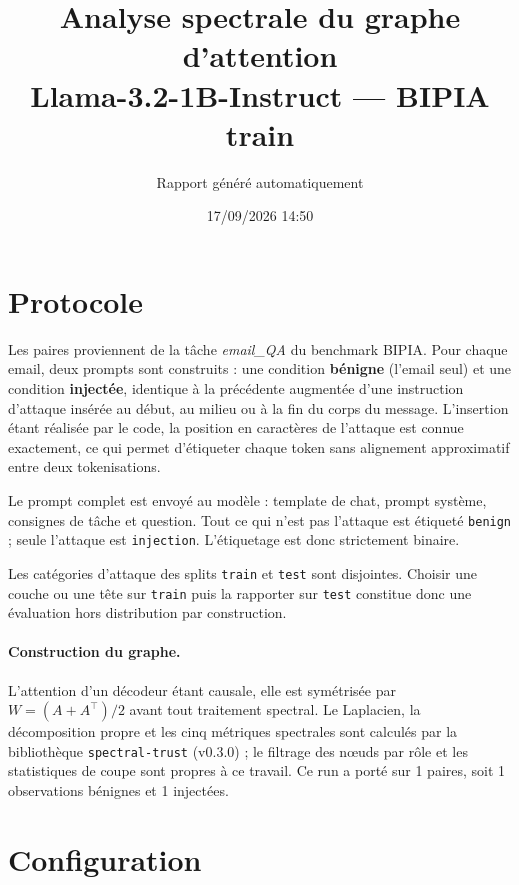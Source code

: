 \documentclass[11pt,a4paper]{article}
\title{Analyse spectrale du graphe d'attention\\Llama-3.2-1B-Instruct --- BIPIA train}
\author{Rapport généré automatiquement}
\date{17/09/2026 14:50}
\begin{document}
\maketitle

\section{Protocole}


Les paires proviennent de la tâche \emph{email\_QA} du benchmark BIPIA.
Pour chaque email, deux prompts sont construits : une condition \textbf{bénigne}
(l'email seul) et une condition \textbf{injectée}, identique à la précédente
augmentée d'une instruction d'attaque insérée au début, au milieu ou à la fin
du corps du message. L'insertion étant réalisée par le code, la position en
caractères de l'attaque est connue exactement, ce qui permet d'étiqueter chaque
token sans alignement approximatif entre deux tokenisations.

Le prompt complet est envoyé au modèle : template de chat, prompt système,
consignes de tâche et question. Tout ce qui n'est pas l'attaque est étiqueté
\texttt{benign} ; seule l'attaque est \texttt{injection}. L'étiquetage est
donc strictement binaire.

Les catégories d'attaque des splits \texttt{train} et \texttt{test} sont
disjointes. Choisir une couche ou une tête sur \texttt{train} puis la
rapporter sur \texttt{test} constitue donc une évaluation hors distribution
par construction.

\paragraph{Construction du graphe.} L'attention d'un décodeur étant causale,
elle est symétrisée par $W = (A + A^{\top})/2$ avant tout traitement spectral.
Le Laplacien, la décomposition propre et les cinq métriques spectrales sont
calculés par la bibliothèque \texttt{spectral-trust} (v0.3.0) ; le filtrage
des n\oe uds par rôle et les statistiques de coupe sont propres à ce travail.
Ce run a porté sur 1 paires, soit 1 observations bénignes et
1 injectées.


\section{Configuration}
\end{document}

